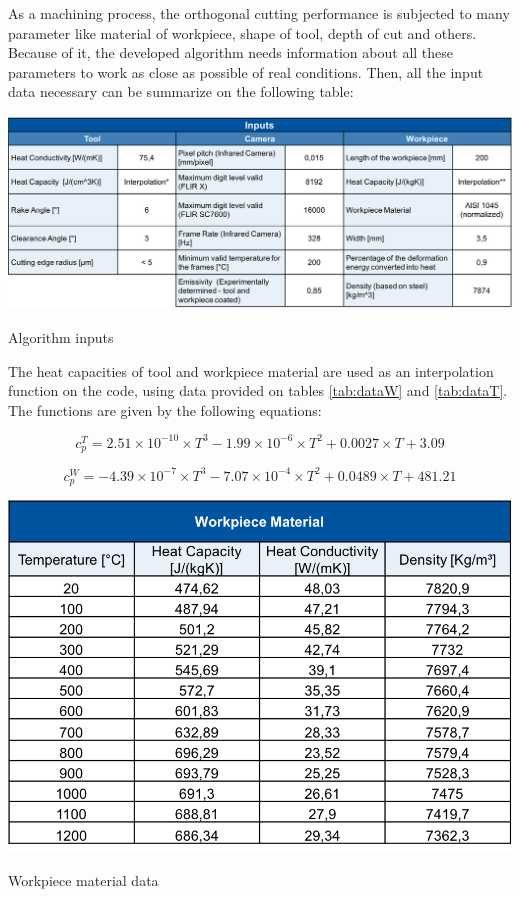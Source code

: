		As a machining process, the orthogonal cutting performance is subjected to many parameter like material of workpiece, shape of tool, depth of cut and others. Because of it, the developed algorithm needs information about all these parameters to work as close as possible of real conditions. Then, all the input data necessary can be summarize on the following table:

		\begin{table}[H]
			\centering
			\captionsetup{justification=centering}
			\includegraphics[scale = 0.6]{Imagens/Inputs.png}
			\caption{Algorithm inputs \cite{augspurger2016experimental}}
			\label{tab:inputs}
		\end{table}

		The heat capacities of tool and workpiece material are used as an interpolation function on the code, using data provided on tables \ref{tab:dataW} and \ref{tab:dataT}. The functions are given by the following equations:

		\begin{equation} 
		\label{eq_heatCapTool}
			c_{p}^{T} = 2.51\times 10^{- 10}\times T^{3} - 1.99\times 10^{- 6} \times T^{2} + 0.0027 \times T + 3.09
		\end{equation}

		\begin{equation} 
		\label{eq_heatCapWork}
			c_{p}^{W} = -4.39\times 10^{- 7}\times T^{3} - 7.07\times 10^{- 4} \times T^{2} + 0.0489 \times T + 481.21
		\end{equation}

		\begin{table}[h]
			\centering
			\captionsetup{justification=centering}
			\includegraphics[scale = 0.6]{Imagens/dataWorkpiece.png}
			\caption{Workpiece material data \cite{augspurger2016experimental}}
			\label{tab:dataW}
		\end{table}

